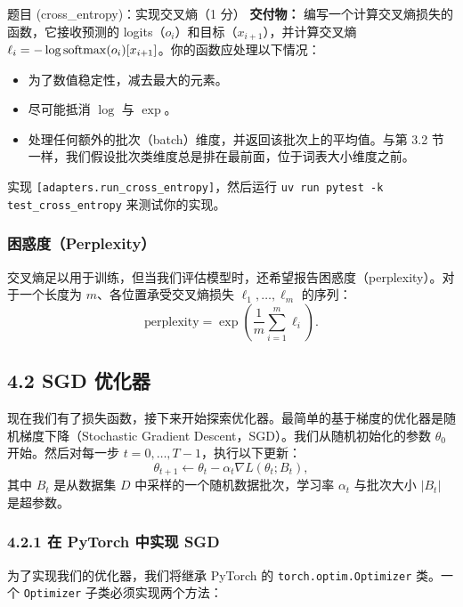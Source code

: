 \begin{problembox}{题目 (cross\_entropy)：实现交叉熵（1 分）}
\textbf{交付物：} 编写一个计算交叉熵损失的函数，它接收预测的 logits（$o_i$）和目标（$x_{i+1}$），并计算交叉熵 $\ell_i = -\log \operatorname{softmax}(o_i)[x_{i+1}]$。你的函数应处理以下情况：
\begin{itemize}
  \item 为了数值稳定性，减去最大的元素。
  \item 尽可能抵消 $\log$ 与 $\exp$。
  \item 处理任何额外的批次（batch）维度，并返回该批次上的平均值。与第 3.2 节一样，我们假设批次类维度总是排在最前面，位于词表大小维度之前。
\end{itemize}
实现 \texttt{[adapters.run\_cross\_entropy]}，然后运行 \texttt{uv run pytest -k test\_cross\_entropy} 来测试你的实现。
\end{problembox}

\subsubsection*{困惑度（Perplexity）}

交叉熵足以用于训练，但当我们评估模型时，还希望报告困惑度（perplexity）。对于一个长度为 $m$、各位置承受交叉熵损失 $\ell_1, \dots, \ell_m$ 的序列：
\begin{equation*}
\text{perplexity} = \exp\!\left(\frac{1}{m} \sum_{i=1}^{m} \ell_i\right). \tag{18}
\end{equation*}

\subsection*{4.2 SGD 优化器}

现在我们有了损失函数，接下来开始探索优化器。最简单的基于梯度的优化器是随机梯度下降（Stochastic Gradient Descent，SGD）。我们从随机初始化的参数 $\theta_0$ 开始。然后对每一步 $t = 0, \dots, T-1$，执行以下更新：
\begin{equation*}
\theta_{t+1} \leftarrow \theta_t - \alpha_t \nabla L(\theta_t; B_t), \tag{19}
\end{equation*}
其中 $B_t$ 是从数据集 $D$ 中采样的一个随机数据批次，学习率 $\alpha_t$ 与批次大小 $|B_t|$ 是超参数。

\subsubsection*{4.2.1 在 PyTorch 中实现 SGD}

为了实现我们的优化器，我们将继承 PyTorch 的 \texttt{torch.optim.Optimizer} 类。一个 \texttt{Optimizer} 子类必须实现两个方法：

